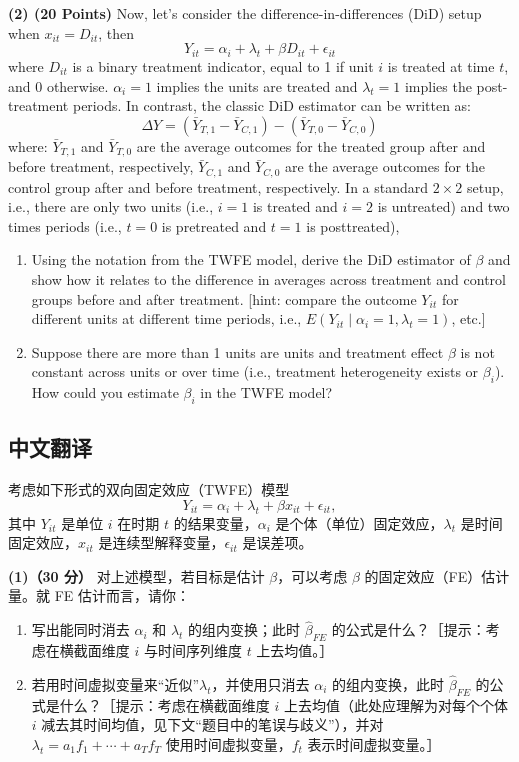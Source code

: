 \begin{tcolorbox}[bxbase,colback=ceng!3,colframe=ceng,boxed title style={colback=ceng},fontupper=\small,
  title={中南大学 2025 年春季博士研究生《高级计量经济学 DP》课程考试试卷（第 1 页）}]
\textbf{(2) (20 Points)} Now, let's consider the difference-in-differences (DiD) setup when $x_{it}=D_{it}$, then
\[
Y_{it}=\alpha_i+\lambda_t+\beta D_{it}+\epsilon_{it}
\]
where $D_{it}$ is a binary treatment indicator, equal to 1 if unit $i$ is treated at time $t$, and 0 otherwise. $\alpha_i=1$ implies the units are treated and $\lambda_t=1$ implies the post-treatment periods. In contrast, the classic DiD estimator can be written as:
\[
\Delta Y=(\bar Y_{T,1}-\bar Y_{C,1})-(\bar Y_{T,0}-\bar Y_{C,0})
\]
where: $\bar Y_{T,1}$ and $\bar Y_{T,0}$ are the average outcomes for the treated group after and before treatment, respectively, $\bar Y_{C,1}$ and $\bar Y_{C,0}$ are the average outcomes for the control group after and before treatment, respectively. In a standard $2\times2$ setup, i.e., there are only two units (i.e., $i=1$ is treated and $i=2$ is untreated) and two times periods (i.e., $t=0$ is pretreated and $t=1$ is posttreated),
\begin{enumerate}[label=(\alph*)]
  \item Using the notation from the TWFE model, derive the DiD estimator of $\beta$ and show how it relates to the difference in averages across treatment and control groups before and after treatment. [hint: compare the outcome $Y_{it}$ for different units at different time periods, i.e., $E(Y_{it}\mid\alpha_i=1,\lambda_t=1)$, etc.]
  \item Suppose there are more than 1 units are units and treatment effect $\beta$ is not constant across units or over time (i.e., treatment heterogeneity exists or $\beta_i$). How could you estimate $\beta_i$ in the TWFE model?
\end{enumerate}
\end{tcolorbox}

\subsection{中文翻译}

考虑如下形式的双向固定效应（TWFE）模型
\[
Y_{it}=\alpha_i+\lambda_t+\beta x_{it}+\epsilon_{it},
\]
其中 $Y_{it}$ 是单位 $i$ 在时期 $t$ 的结果变量，$\alpha_i$ 是个体（单位）固定效应，$\lambda_t$ 是时间固定效应，$x_{it}$ 是连续型解释变量，$\epsilon_{it}$ 是误差项。

\textbf{(1)（30 分）} 对上述模型，若目标是估计 $\beta$，可以考虑 $\beta$ 的固定效应（FE）估计量。就 FE 估计而言，请你：
\begin{enumerate}[label=(\alph*)]
  \item 写出能同时消去 $\alpha_i$ 和 $\lambda_t$ 的组内变换；此时 $\hat\beta_{FE}$ 的公式是什么？［提示：考虑在横截面维度 $i$ 与时间序列维度 $t$ 上去均值。］
  \item 若用时间虚拟变量来“近似”$\lambda_t$，并使用只消去 $\alpha_i$ 的组内变换，此时 $\hat\beta_{FE}$ 的公式是什么？［提示：考虑在横截面维度 $i$ 上去均值（此处应理解为对每个个体 $i$ 减去其时间均值，见下文“题目中的笔误与歧义”），并对 $\lambda_t=a_1f_1+\cdots+a_Tf_T$ 使用时间虚拟变量，$f_t$ 表示时间虚拟变量。］
\end{enumerate}

